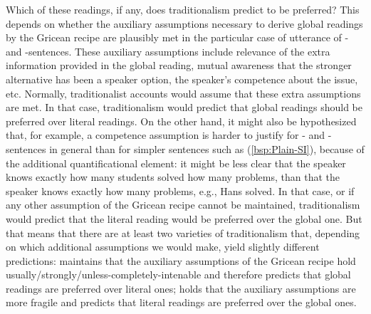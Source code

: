 \documentclass[fleqn,reqno,10pt,draft]{article}
\newcommand{\as}{\acro{as}}
\renewcommand{\es}{\acro{es}}
\begin{document}
Which of these readings, if any, does traditionalism predict to be
preferred? This depends on whether the auxiliary assumptions necessary
to derive global readings by the Gricean recipe are plausibly met in
the particular case of utterance of \as- and \es-sentences. These
auxiliary assumptions include relevance of the extra information
provided in the global reading, mutual awareness that the stronger
alternative has been a speaker option, the speaker's competence about
the issue, etc. Normally, traditionalist accounts would assume that
these extra assumptions are met. In that case, traditionalism would
predict that global readings should be preferred over literal
readings. On the other hand, it might also be hypothesized that, for
example, a competence assumption is harder to justify for \as- and
\es-sentences in general than for simpler sentences such as
(\ref{bsp:Plain-SI}), because of the additional quantificational
element: it might be less clear that the speaker knows exactly how
many students solved how many problems, than that the speaker knows
exactly how many problems, e.g., Hans solved. In that case, or if any
other assumption of the Gricean recipe cannot be maintained,
traditionalism would predict that the literal reading would be
preferred over the global one. But that means that there are at least
two varieties of traditionalism that, depending on which additional
assumptions we would make, yield slightly different predictions:
 maintains that the
auxiliary assumptions of the Gricean recipe hold
usually/strongly/unless-completely-intenable and therefore predicts
that global readings are preferred over literal ones;  holds that the auxiliary assumptions are
more fragile and predicts that literal readings are preferred over the
global ones.
\end{document}
